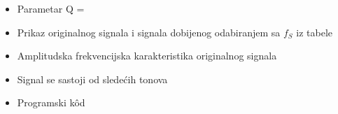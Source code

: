 
\begin{itemize}
    \item Parametar Q = 
    \item Prikaz originalnog signala i signala dobijenog odabiranjem sa $f_S$ iz tabele
    \item Amplitudska frekvencijska karakteristika originalnog signala
    \item Signal se sastoji od sledećih tonova
    \item Programski k\^{o}d 
\end{itemize}

